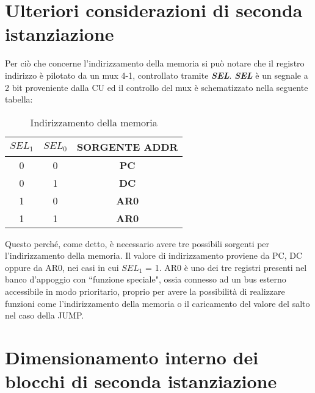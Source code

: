 \section{Ulteriori considerazioni di seconda istanziazione}
Per ciò che concerne l'indirizzamento della memoria si può notare che il registro indirizzo è pilotato da un mux 4-1, controllato tramite \textit{\textbf{SEL}}. \textit{\textbf{SEL}} è un segnale a 2 bit proveniente dalla CU ed il controllo del mux è schematizzato nella seguente tabella:
\begin{table}[H]
	\centering
	\footnotesize
	\fontsize{10}{18}\selectfont
	\begin{tabular}{|p{1.5cm}|p{1.5cm}|p{2.5cm}|}
		\hline
		\multicolumn{1}{|c|}{\textit{$SEL_1$}} &
		\multicolumn{1}{c|}{\textit{$SEL_0$}} & 
		\multicolumn{1}{c|}{SORGENTE ADDR}\\
		
		\hline
		\multicolumn{1}{|c|}{0} &
		\multicolumn{1}{c|}{0} & 
		\multicolumn{1}{c|}{\textbf{PC}}\\
		
		\hline
		\multicolumn{1}{|c|}{0} &
		\multicolumn{1}{c|}{1} & 
		\multicolumn{1}{c|}{\textbf{DC}}\\
		
		\hline
		\multicolumn{1}{|c|}{1} &
		\multicolumn{1}{c|}{0} & 
		\multicolumn{1}{c|}{\textbf{AR0}}\\
		
		\hline
		\multicolumn{1}{|c|}{1} &
		\multicolumn{1}{c|}{1} & 
		\multicolumn{1}{c|}{\textbf{AR0}}\\ \hline
	\end{tabular}
	\caption{Indirizzamento della memoria}
	\label{2_tabella_SEL}
\end{table}
\noindent
Questo perché, come detto, è necessario avere tre possibili sorgenti per l'indirizzamento della memoria. Il valore di indirizzamento proviene da PC, DC oppure da AR0, nei casi in cui $SEL_1$ = 1. AR0 è uno dei tre registri presenti nel banco d'appoggio con \textquotedblleft funzione speciale", ossia connesso ad un bus esterno accessibile in modo prioritario, proprio per avere la possibilità di realizzare funzioni come l'indirizzamento della memoria o il caricamento del valore del salto nel caso della JUMP.

\section{Dimensionamento interno dei blocchi di seconda istanziazione}
